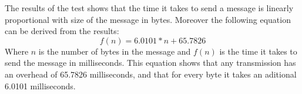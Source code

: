 The results of the test shows that the time it takes to send a message is linearly proportional with size of the message in bytes.
Moreover the following equation can be derived from the results:
\begin{equation}
f(n)=6.0101 * n + 65.7826
\end{equation}
Where $n$ is the number of bytes in the message and $f(n)$ is the time it takes to send the message in milliseconds.
This equation shows that any transmission has an overhead of 65.7826 milliseconds, and that for every byte it takes an aditional 6.0101 milliseconds.    

